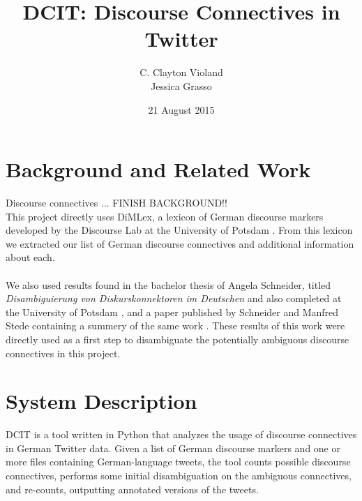 \documentclass[11pt]{article}
\title{\textbf{DCIT: Discourse Connectives in Twitter}}
\author{C. Clayton Violand  \mono{charles.violand@uni-potsdam.de}
\\Jessica Grasso \mono{jgrasso@uni-potsdam.de}}
\date{21 August 2015}
\begin{document}
\maketitle


\section{Background and Related Work}

Discourse connectives ... FINISH BACKGROUND!! \\

This project directly uses DiMLex, a lexicon of German discourse markers developed by the Discourse Lab at the University of Potsdam \cite{dimlex}.  From this lexicon we extracted our list of German discourse connectives and additional information about each.\\
\\
We also used results found in the bachelor thesis of Angela Schneider, titled \emph{Disambiguierung von Diskurskonnektoren im Deutschen} and also completed at the University of Potsdam \cite{schneider1}, and a paper published by Schneider and Manfred Stede containing a summery of the same work \cite{schneider2}.  These results of this work were directly used as a  first step to disambiguate the potentially ambiguous discourse connectives in this project.

\section{System Description}
DCIT is a tool written in Python that analyzes the usage of discourse connectives in German Twitter data.  Given a list of German discourse markers and one or more files containing German-language tweets, the tool counts possible discourse connectives, performs some initial disambiguation on the ambiguous connectives, and re-counts, outputting annotated versions of the tweets.
\end{document}
